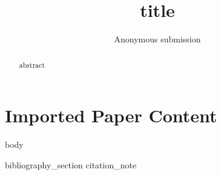 \documentclass{article}
\author{Anonymous submission}
\title{{{title}}}
\begin{document}
\maketitle

\begin{abstract}
{{abstract}}
\end{abstract}

\section*{Imported Paper Content}
{{body}}

{{bibliography_section}}
{{citation_note}}
\end{document}
